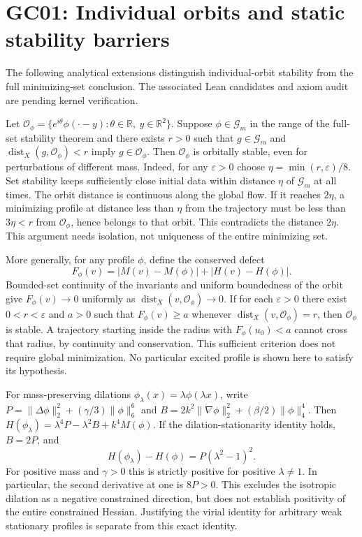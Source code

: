 \documentclass[11pt]{article}
\DeclareMathOperator{\dist}{dist}
\newcommand{\GG}{\mathcal G}
\begin{document}
\section{GC01: Individual orbits and static stability barriers}
\label{sec:gc01-orbits}
The following analytical extensions distinguish individual-orbit
stability from the full minimizing-set conclusion. The associated
Lean candidates and axiom audit are pending kernel verification.

Let \(\mathcal O_\phi=\{e^{i\theta}\phi(\cdot-y):
\theta\in\mathbb R,\ y\in\mathbb R^2\}\).
Suppose \(\phi\in\GG_m\) in the range of the full-set stability theorem
and there exists \(r>0\) such that \(g\in\GG_m\) and
\(\dist_X(g,\mathcal O_\phi)<r\) imply \(g\in\mathcal O_\phi\).
Then \(\mathcal O_\phi\) is orbitally stable, even for perturbations
of different mass. Indeed, for any \(\varepsilon>0\) choose
\(\eta=\min(r,\varepsilon)/8\). Set stability keeps sufficiently close
initial data within distance \(\eta\) of \(\GG_m\) at all times.
The orbit distance is continuous along the global flow. If it
reaches \(2\eta\), a minimizing profile at distance less than
\(\eta\) from the trajectory must be less than \(3\eta<r\) from
\(\mathcal O_\phi\), hence belongs to that orbit. This contradicts
the distance \(2\eta\). This argument needs isolation, not uniqueness
of the entire minimizing set.

More generally, for any profile \(\phi\), define the conserved defect
\[
 F_\phi(v)=|M(v)-M(\phi)|+|H(v)-H(\phi)|.
\]
Bounded-set continuity of the invariants and uniform boundedness of
the orbit give \(F_\phi(v)\to0\) uniformly as
\(\dist_X(v,\mathcal O_\phi)\to0\).
If for each \(\varepsilon>0\) there exist \(0<r<\varepsilon\) and \(a>0\)
such that \(F_\phi(v)\ge a\) whenever
\(\dist_X(v,\mathcal O_\phi)=r\), then \(\mathcal O_\phi\) is stable.
A trajectory starting inside the radius with \(F_\phi(u_0)<a\)
cannot cross that radius, by continuity and conservation.
This sufficient criterion does not require global minimization.
No particular excited profile is shown here to satisfy its hypothesis.

For mass-preserving dilations \(\phi_\lambda(x)=\lambda\phi(\lambda x)\),
write \(P=\|\Delta\phi\|_2^2+(\gamma/3)\|\phi\|_6^6\) and
\(B=2k^2\|\nabla\phi\|_2^2+(\beta/2)\|\phi\|_4^4\).
Then \(H(\phi_\lambda)=\lambda^4P-\lambda^2B+k^4M(\phi)\).
If the dilation-stationarity identity holds, \(B=2P\), and
\[
 H(\phi_\lambda)-H(\phi)=P(\lambda^2-1)^2 .
\]
For positive mass and \(\gamma>0\) this is strictly positive for
positive \(\lambda\ne1\). In particular, the second derivative at
one is \(8P>0\). This excludes the isotropic dilation as a negative
constrained direction, but does not establish positivity of the entire
constrained Hessian. Justifying the virial identity for arbitrary weak
stationary profiles is separate from this exact identity.
\end{document}
